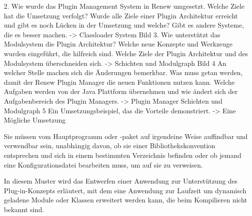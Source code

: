 			2.	Wie wurde das Plugin Management System in Renew umgesetzt. Welche Ziele hat die Umsetzung verfolgt? Wurde alle Ziele einer Plugin Architektur erreicht und gibt es noch Lücken in der Umsetzung und welche? Gibt es andere Systeme, die es besser machen. 
			-> Classloader System Bild 
			3.	Wie unterstützt das Modulsystem die Plugin Architektur? Welche neue Konzepte und Werkzeuge wurden eingeführt, die hilfreich sind. Welche Ziele der Plugin Architektur und des Modulsystem überschneiden sich.
			-> Schichten und Modulgraph Bild 
			4	An welcher Stelle machen sich die Änderungen bemerkbar. Was muss getan werden, damit der Renew Plugin Manager die neuen Funktionen nutzen kann. Welche Aufgaben werden von der Java Plattform übernehmen und wie ändert sich  der Aufgabenbereich des Plugin Managers. 
			->  Plugin Manager Schichten und Modulgraph 
			5	Ein Umsetzungsbeispiel, das die Vorteile demonstriert. 
			-> Eine Mögliche Umsetzung 





Sie müssen vom Hauptprogramm oder -paket auf irgendeine Weise auffindbar und verwendbar sein, unabhängig davon, ob sie einer Bibliothekskonvention entsprechen und sich in einem bestimmten Verzeichnis befinden oder ob jemand eine Konfigurationsdatei bearbeiten muss, um auf sie zu verweisen.


In diesem Muster wird das Entwerfen einer Anwendung zur Unterstützung des Plug-in-Konzepts erläutert, mit dem eine Anwendung zur Laufzeit um dynamisch geladene Module oder Klassen erweitert werden kann, die beim Kompilieren nicht bekannt sind.

